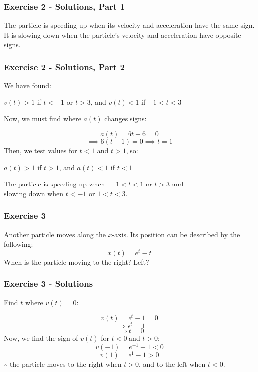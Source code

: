 \documentclass[12pt]{beamer}
\begin{document}
\begin{frame}
	\frametitle{Exercise 2 - Solutions, Part 1}

	\large
	The particle is speeding up when its velocity and acceleration have the same sign. It is slowing down when the particle's velocity and acceleration have opposite signs.\par
\end{frame}
\begin{frame}
	\frametitle{Exercise 2 - Solutions, Part 2}

	We have found:\par
	\begin{center}
		$v(t)>1$ if $t<-1$ or $t>3$, and $v(t)<1$ if $-1<t<3$
	\end{center}
	\vfill
	Now, we must find where $a(t)$ changes signs:\par
	\[a(t)=6t-6=0\]
	\[\implies 6(t-1)=0\implies t=1\]
	Then, we test values for $t<1$ and $t>1$, so:\par
	\begin{center}
		$a(t)>1$ if $t>1$, and $a(t)<1$ if $t<1$
	\end{center}
	The particle $\boxed{\text{is speeding up when }-1<t<1\text{ or }t>3}$ and $\boxed{\text{slowing down when }t<-1\text{ or }1<t<3}$.
\end{frame}
\begin{frame}
	\frametitle{Exercise 3}

	\large
	Another particle moves along the $x$-axis. Its position can be described by the following: \[x(t)=e^t-t\]
	\vfill
	When is the particle moving to the right? Left?
	\vfill
	\vfill
\end{frame}
\begin{frame}
	\frametitle{Exercise 3 - Solutions}

	Find $t$ where $v(t)=0$:\par
	\[v(t)=e^t-1=0\]
	\[\implies e^t=1\]
	\[\implies t=0\]
	\vfill
	Now, we find the sign of $v(t)$ for $t<0$ and $t>0$:
	\[v(-1)=e^{-1}-1<0\]
	\[v(1)=e^{1}-1>0\]
	$\therefore$ the particle moves $\boxed{\text{to the right when }t>0}$, and $\boxed{\text{to the left when }t<0}$.
\end{frame}
\end{document}
